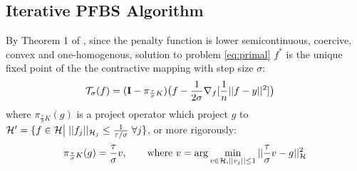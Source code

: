 \documentclass[tablecaption=bottom,wcp]{jmlr} %
\begin{document}
\subsection{Iterative PFBS Algorithm}
By Theorem 1 of \citet{rosasco-prox-2009}, since the penalty function is lower semicontinuous, coercive, convex and one-homogenous,   solution to problem \ref{eq:primal} $f^*$ is the unique fixed point of the the contractive mapping with step size $\sigma$:
\begin{align*}
{\cal T}_\sigma(f) &= ({\bf I} - \pi_{\frac{\tau}{\sigma}K}) 
\big(f - \frac{1}{2\sigma} 
\nabla_f [ \frac{1}{n}||f - y||^2 ] \big)
\end{align*}
where $\pi_{\frac{\tau}{\sigma}K}(g)$ is a project operator which project $g$ to ${\cal H}' = \{f \in {\cal H} \big|\;   ||f_j||_{{\cal H}_j} \leq \frac{1}{\tau/\sigma} \; \forall j \}$, or more rigorously:
$$ \pi_{\frac{\tau}{\sigma}K}(g) = \frac{\tau}{\sigma} v, \qquad \mbox{where } v = \arg\min_{v\in {\cal H}, ||v_j||\leq 1} ||\frac{\tau}{\sigma}v - g||_{\cal H}^2$$
\end{document}

